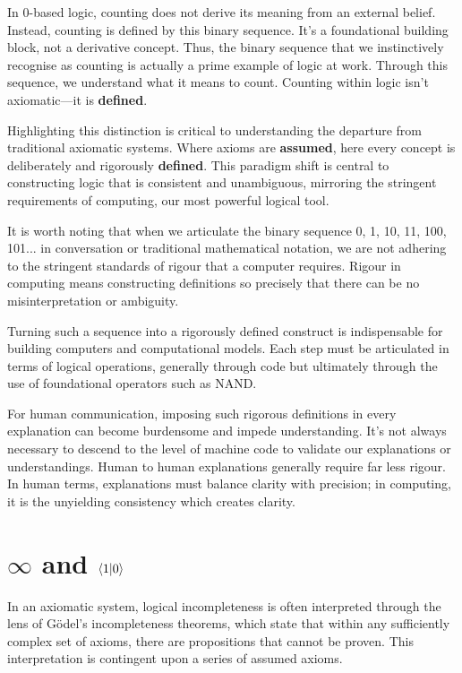 \documentclass{article}
\begin{document}
In 0-based logic, counting does not derive its meaning from an external belief. Instead, counting is defined by this binary sequence. It's a foundational building block, not a derivative concept. Thus, the binary sequence that we instinctively recognise as counting is actually a prime example of logic at work. Through this sequence, we understand what it means to count. Counting within logic isn’t axiomatic—it is \textbf{defined}.

Highlighting this distinction is critical to understanding the departure from traditional axiomatic systems. Where axioms are \textbf{assumed}, here every concept is deliberately and rigorously \textbf{defined}. This paradigm shift is central to constructing logic that is consistent and  unambiguous, mirroring the stringent requirements of computing, our most powerful logical tool.

It is worth noting that when we articulate the binary sequence 0, 1, 10, 11, 100, 101... in conversation or traditional mathematical notation, we are not adhering to the stringent standards of rigour that a computer requires. Rigour in computing means constructing definitions so precisely that there can be no misinterpretation or ambiguity.

Turning such a sequence into a rigorously defined construct is indispensable for building computers and computational models. Each step must be articulated in terms of logical operations, generally through code but ultimately through the use of foundational operators such as NAND.

For human communication, imposing such rigorous definitions in every explanation can become burdensome and impede understanding. It's not always necessary to descend to the level of machine code to validate our explanations or understandings. Human to human explanations generally require far less rigour. In human terms, explanations must balance clarity with precision; in computing, it is the unyielding consistency which creates clarity.

\section*{$\infty$ and $\langle 1 | 0 \rangle$}

In an axiomatic system, logical incompleteness is often interpreted through the lens of Gödel’s incompleteness theorems, which state that within any sufficiently complex set of axioms, there are propositions that cannot be proven. This interpretation is contingent upon a series of assumed axioms.
\end{document}
